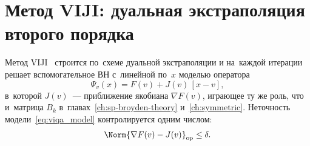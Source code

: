 \section{Метод VIJI: дуальная экстраполяция второго порядка}\label{sec:viqa_method}

Метод VIJI~\cite{viqa2024} строится по~схеме дуальной экстраполяции и
на~каждой итерации решает вспомогательное ВН с~линейной по~$x$ моделью
оператора
\begin{equation}\label{eq:viqa_model}
  \Psi_v(x) = F(v) + J(v)\,[x-v],
\end{equation}
в~которой $J(v)$~--- приближение якобиана $\nabla F(v)$, играющее ту же
роль, что и~матрица $B_k$ в~главах~\ref{ch:sp-broyden-theory}
и~\ref{ch:symmetric}. Неточность модели~\eqref{eq:viqa_model}
контролируется одним числом:
\begin{equation}\label{eq:viqa_delta}
  \Norm{\nabla F(v) - J(v)}_{\mathrm{op}} \le \delta .
\end{equation}

